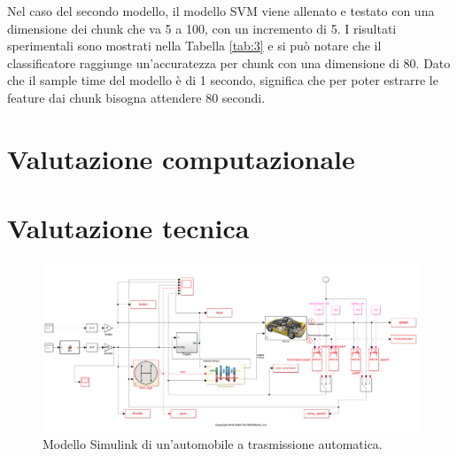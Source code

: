 \documentclass[Lau,binding=0.6cm]{sapthesis}
\begin{document}
Nel caso del secondo modello, il modello SVM viene allenato e testato con una dimensione dei chunk che va 5 a 100, con un incremento di 5.
I risultati sperimentali sono mostrati nella Tabella \ref{tab:3} e si pu\`o notare che il classificatore raggiunge un'accuratezza per chunk con una dimensione di 80.
Dato che il sample time del modello \`e di 1 secondo, significa che per poter estrarre le feature dai chunk bisogna attendere 80 secondi.


\begin{table}[htb]
    \begin{center}
    \end{center}   
    \caption{Risultati, relativi al primo modello, della k-fold cross validation per diversi valori di k.} 
    \label{tab:4}
\end{table}

\section{Valutazione computazionale} %


\section{Valutazione tecnica}

\begin{figure}
    \includegraphics[scale=0.38]{car.png}
    \centering
    \caption{Modello Simulink di un'automobile a trasmissione automatica.}
    \label{fig:1}
\end{figure}
\end{document}
